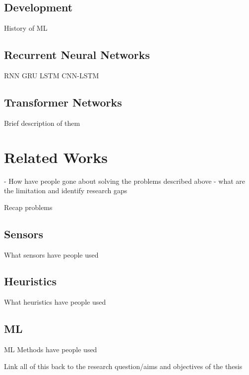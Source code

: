 \subsection{Development}
History of ML

\subsection{Recurrent Neural Networks}
RNN
GRU
LSTM
CNN-LSTM

\subsection{Transformer Networks}
Brief description of them


\section{Related Works} - %
How have people gone about solving the problems described above - what are the limitation and identify research gaps

Recap problems

\subsection{Sensors}
What sensors have people used

\subsection{Heuristics}
What heuristics have people used

\subsection{ML} %
ML Methods have people used


Link all of this back to the research question/aims and objectives of the thesis

